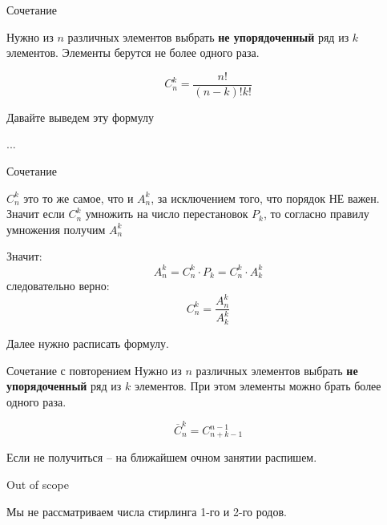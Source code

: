 \begin{frame}{Сочетание}
	
Нужно из
$n$
различных элементов 
выбрать \textbf{не упорядоченный}
ряд из $k$
элементов. 
Элементы берутся не более одного раза.

\begin{equation}
C_n^k = \frac{n!}{\left( n-k\right)! k!}
\end{equation}

Давайте выведем эту формулу

...
\end{frame}

\begin{frame}{Сочетание}

$C_n^k$ это то же самое, 
что и $A_n^k$, за исключением того, что порядок НЕ важен.
Значит если  $C_n^k$ умножить на число перестановок $P_k$,
то согласно правилу умножения получим $A_n^k$

Значит:
\begin{equation*}
A_n^k = C_n^k \cdot P_k = C_n^k \cdot A_k^k
\end{equation*}
следовательно верно:
\begin{equation*}
C_n^k = \frac{A_n^k}{A_k^k}
\end{equation*}

Далее нужно расписать формулу. 

\end{frame}

\begin{frame}{Сочетание с повторением}
Нужно из
$n$
различных элементов 
выбрать \textbf{не упорядоченный}
ряд из $k$
элементов.
При этом элементы можно брать более одного раза.

\begin{equation}
\overline{C}_n^k = C_{n+k-1}^{n-1}
\end{equation}

Если не получиться -- на ближайшем очном занятии распишем.
	
\end{frame}

\begin{frame}{Out of scope}
	
Мы не рассматриваем числа стирлинга 1-го и 2-го родов.

\end{frame}

